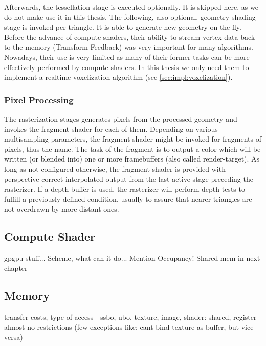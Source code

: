 \documentclass[thesis.tex]{subfiles}
\begin{document}
Afterwards, the tessellation stage is executed optionally.
It is skipped here, as we do not make use it in this thesis.
The following, also optional, geometry shading stage is invoked per triangle.
It is able to generate new geometry on-the-fly.
Before the advance of compute shaders, their ability to stream vertex data back to the memory (Transform Feedback) was very important for many algorithms.
Nowadays, their use is very limited as many of their former tasks can be more effectively performed by compute shaders.
In this thesis we only need them to implement a realtime voxelization algorithm (see \autoref{sec:impl:voxelization}).



\subsubsection{Pixel Processing}
The rasterization stages generates pixels from the processed geometry and invokes the fragment shader for each of them.
Depending on various multisampling parameters, the fragment shader might be invoked for fragments of pixels, thus the name.
The task of the fragment is to output a color which will be written (or blended into) one or more framebuffers (also called render-target).
As long as not configured otherwise, the fragment shader is provided with perspective correct interpolated output from the last active stage preceding the rasterizer.
If a depth buffer is used, the rasterizer will perform depth tests to fulfill a previously defined condition, usually to assure that nearer triangles are not overdrawn by more distant ones.

\subsection{Compute Shader}
gpgpu stuff...
Scheme, what can it do...
Mention Occupancy!
Shared mem in next chapter

\subsection{Memory} \label{sec:preq:memory}
transfer costs, type of access - ssbo, ubo, texture, image, shader: shared, register\\
almost no restrictions (few exceptions like: cant bind texture as buffer, but vice versa)
\end{document}
